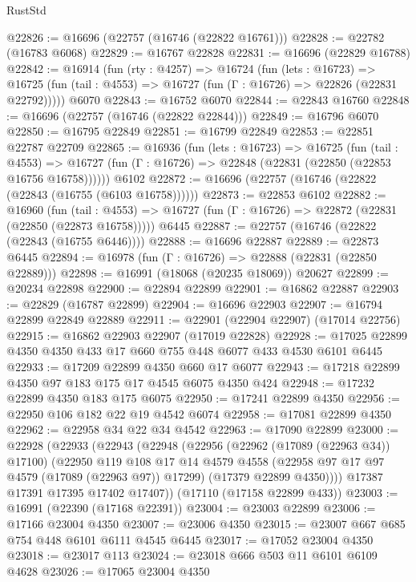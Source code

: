 \begin{lexlean}{RustStd}
\begin{coremodule}
@22826 := @16696 (@22757 (@16746 (@22822 @16761)))
@22828 := @22782 (@16783 @6068)
@22829 := @16767 @22828
@22831 := @16696 (@22829 @16788)
@22842 := @16914
    (fun (rty : @4257) =>
    @16724
      (fun (lets : @16723) =>
      @16725 (fun (tail : @4553) => @16727 (fun (Γ : @16726) => @22826 (@22831 @22792)))))
    @6070
@22843 := @16752 @6070
@22844 := @22843 @16760
@22848 := @16696 (@22757 (@16746 (@22822 @22844)))
@22849 := @16796 @6070
@22850 := @16795 @22849
@22851 := @16799 @22849
@22853 := @22851 @22787 @22709
@22865 := @16936
    (fun (lets : @16723) =>
    @16725
      (fun (tail : @4553) =>
      @16727 (fun (Γ : @16726) => @22848 (@22831 (@22850 (@22853 @16756 @16758))))))
    @6102
@22872 := @16696 (@22757 (@16746 (@22822 (@22843 (@16755 (@6103 @16758))))))
@22873 := @22853 @6102
@22882 := @16960
    (fun (tail : @4553) => @16727 (fun (Γ : @16726) => @22872 (@22831 (@22850 (@22873 @16758)))))
    @6445
@22887 := @22757 (@16746 (@22822 (@22843 (@16755 @6446))))
@22888 := @16696 @22887
@22889 := @22873 @6445
@22894 := @16978 (fun (Γ : @16726) => @22888 (@22831 (@22850 @22889)))
@22898 := @16991 (@18068 (@20235 @18069)) @20627
@22899 := @20234 @22898
@22900 := @22894 @22899
@22901 := @16862 @22887
@22903 := @22829 (@16787 @22899)
@22904 := @16696 @22903
@22907 := @16794 @22899 @22849 @22889
@22911 := @22901 (@22904 @22907) (@17014 @22756)
@22915 := @16862 @22903 @22907 (@17019 @22828)
@22928 := @17025 @22899 @4350 @4350 @433 @17 @660 @755 @448 @6077 @433 @4530 @6101 @6445
@22933 := @17209 @22899 @4350 @660 @17 @6077
@22943 := @17218 @22899 @4350 @97 @183 @175 @17 @4545 @6075 @4350 @424
@22948 := @17232 @22899 @4350 @183 @175 @6075
@22950 := @17241 @22899 @4350
@22956 := @22950 @106 @182 @22 @19 @4542 @6074
@22958 := @17081 @22899 @4350
@22962 := @22958 @34 @22 @34 @4542
@22963 := @17090 @22899
@23000 := @22928
    (@22933
      (@22943
        (@22948
          (@22956
            (@22962 (@17089 (@22963 @34)) @17100)
            (@22950
              @119
              @108
              @17
              @14
              @4579
              @4558
              (@22958 @97 @17 @97 @4579 (@17089 (@22963 @97)) @17299)
              (@17379 @22899 @4350))))
        @17387
        @17391
        @17395
        @17402
        @17407))
    (@17110 (@17158 @22899 @433))
@23003 := @16991 (@22390 (@17168 @22391))
@23004 := @23003 @22899
@23006 := @17166 @23004 @4350
@23007 := @23006 @4350
@23015 := @23007 @667 @685 @754 @448 @6101 @6111 @4545 @6445
@23017 := @17052 @23004 @4350
@23018 := @23017 @113
@23024 := @23018 @666 @503 @11 @6101 @6109 @4628
@23026 := @17065 @23004 @4350

\end{coremodule}
\end{lexlean}
